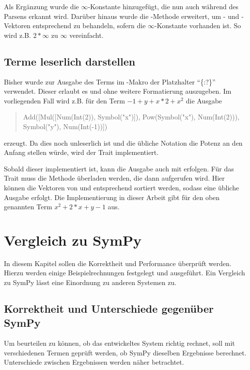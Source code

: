 \documentclass[11pt,a4paper, ngerman]{article}
\begin{document}
Als Ergänzung wurde die $\infty$-Konstante hinzugefügt, die nun auch während des Parsens erkannt wird. Darüber hinaus wurde die -Methode erweitert, um - und -Vektoren entsprechend zu behandeln, sofern die $\infty$-Konstante vorhanden ist. So wird z.B. $2*\infty$ zu $\infty$ vereinfacht.

\subsection{Terme leserlich darstellen}
Bisher wurde zur Ausgabe des Terms im -Makro der Platzhalter ``\{:?\}'' verwendet. Dieser erlaubt es  und  ohne weitere Formatierung auszugeben. Im vorliegenden Fall wird z.B. für den Term $-1+y+x*2+x^2$ die Ausgabe
\begin{quote}
    Add([Mul([Num(Int(2)), Symbol("x")]), Pow(Symbol("x"), Num(Int(2))), Symbol("y"), Num(Int(-1))])
\end{quote}
erzeugt. Da dies noch unleserlich ist und die übliche Notation die Potenz an den Anfang stellen würde, wird der Trait  implementiert.

Sobald dieser implementiert ist, kann die Ausgabe auch mit  erfolgen. Für das Trait muss die Methode  überladen werden, die dann aufgerufen wird. Hier können die Vektoren von  und  entsprechend sortiert werden, sodass eine übliche Ausgabe erfolgt. Die Implementierung in dieser Arbeit gibt für den oben genannten Term $x^2+2*x+y-1$ aus.

\newpage

\section{Vergleich zu SymPy}
In diesem Kapitel sollen die Korrektheit und Performance überprüft werden. Hierzu werden einige Beispielrechnungen festgelegt und ausgeführt. Ein Vergleich zu SymPy lässt eine Einordnung zu anderen Systemen zu.

\subsection{Korrektheit und Unterschiede gegenüber SymPy}
Um beurteilen zu können, ob das entwickeltes System richtig rechnet, soll mit verschiedenen Termen geprüft werden, ob SymPy dieselben Ergebnisse berechnet. Unterschiede zwischen Ergebnissen werden näher betrachtet.
\end{document}
